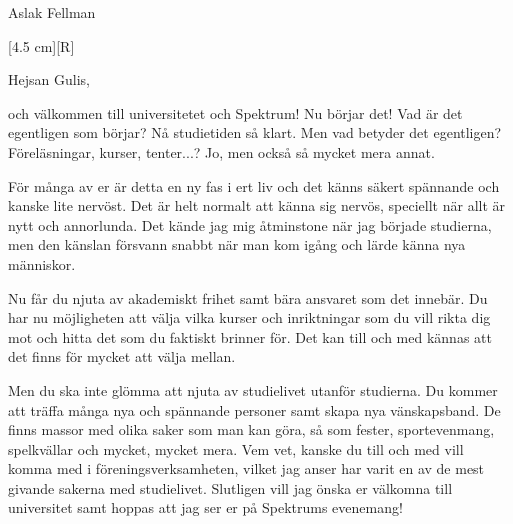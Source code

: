 \documentclass{spektraklet}
\begin{document}
\begin{ordforandespalten}{Aslak Fellman}

[4.5 cm][R]

Hejsan Gulis,

och välkommen till universitetet och Spektrum! Nu börjar det! Vad är det egentligen som börjar? Nå studietiden så klart. Men vad betyder det egentligen? Föreläsningar, kurser, tenter...? Jo, men också så mycket mera annat. 

För många av er är detta en ny fas i ert liv och det känns säkert spännande och kanske lite nervöst. Det är helt normalt att känna sig nervös, speciellt när allt är nytt och annorlunda. Det kände jag mig åtminstone när jag började studierna, men den känslan försvann snabbt när man kom igång och lärde känna nya människor. 

Nu får du njuta av akademiskt frihet samt bära ansvaret som det innebär. Du har nu möjligheten att välja vilka kurser och inriktningar som du vill rikta dig mot och hitta det som du faktiskt brinner för. Det kan till och med kännas att det finns för mycket att välja mellan.

Men du ska inte glömma att njuta av studielivet utanför studierna. Du kommer att träffa många nya och spännande personer samt skapa nya vänskapsband. De finns massor med olika saker som man kan göra, så som fester, sportevenmang, spelkvällar och mycket, mycket mera. Vem vet, kanske du till och med vill komma med i föreningsverksamheten, vilket jag anser har varit en av de mest givande sakerna med studielivet. Slutligen vill jag önska er välkomna till universitet samt hoppas att jag ser er på Spektrums evenemang!

\end{ordforandespalten}
\end{document}
